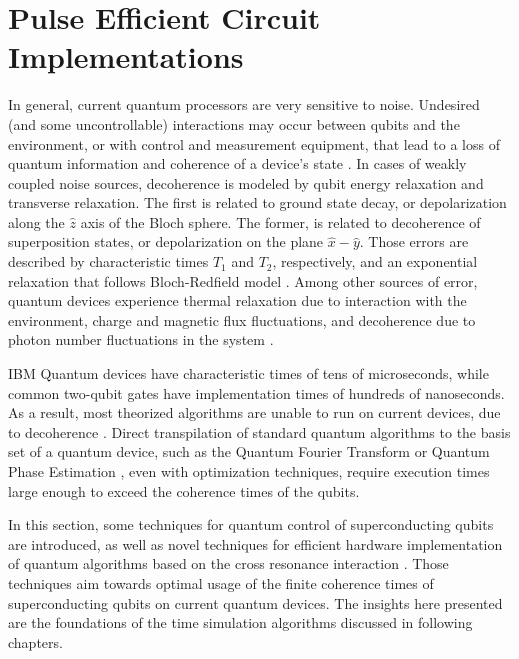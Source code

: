     

\section{Pulse Efficient Circuit Implementations}
\label{sec:pulseFunda}

  In general, current quantum processors are very sensitive to noise. Undesired (and some uncontrollable) interactions may occur between qubits and the environment, or with control and measurement equipment, that lead to a loss of quantum information and coherence of a device's state \cite{quantumEngineer}. In cases of weakly coupled noise sources, decoherence is modeled by qubit energy relaxation and transverse relaxation. The first is related to ground state decay, or depolarization along the $\hat{z}$ axis of the Bloch sphere. The former, is related to decoherence of superposition states, or depolarization on the plane $\hat{x}-\hat{y}$. Those errors are described by characteristic times $T_1$ and $T_2$, respectively, and an exponential relaxation that follows Bloch-Redfield model \cite{quantumEngineer}. Among other sources of error, quantum devices experience thermal relaxation due to interaction with the environment, charge and magnetic flux fluctuations, and decoherence due to photon number fluctuations in the system \cite{quantumEngineer}. 
  
  IBM Quantum devices have characteristic times of tens of microseconds, while common two-qubit gates have implementation times of hundreds of nanoseconds. As a result, most theorized algorithms are unable to run on current devices, due to decoherence \cite{MajoranaSimulation, RXZPulseEfficient, QuantumChem2, QuantumChem1}. Direct transpilation of standard quantum algorithms to the basis set of a quantum device, such as the Quantum Fourier Transform or Quantum Phase Estimation \cite{Nielsen}, even with optimization techniques, require execution times large enough to exceed the coherence times of the qubits.

  In this section, some techniques for quantum control of superconducting qubits are introduced, as well as novel techniques for efficient hardware implementation of quantum algorithms based on the cross resonance interaction \cite{RXZPulseEfficient, 2016RZXCalibration}. Those techniques aim towards optimal usage of the finite coherence times of superconducting qubits on current quantum devices. The insights here presented are the foundations of the time simulation algorithms discussed in following chapters.

